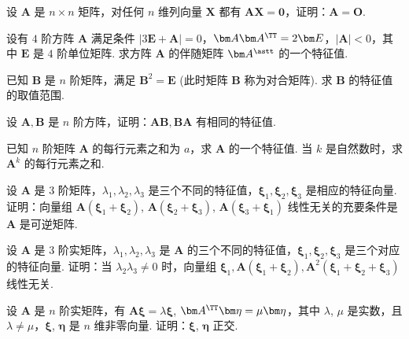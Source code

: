 	\begin{titwo}
		设 $\bm A$ 是 $n \times n$ 矩阵，对任何 $n$ 维列向量 $\bm X$ 都有 $\bm A \bm X = \bm 0$，证明：$\bm A = \bm O$.
	\end{titwo}

	\begin{titwo}
		设有 $4$ 阶方阵 $\bm A$ 满足条件 $|3 \bm E + \bm A| = 0$，$\bm A \bm A^{\TT} = 2 \bm E$，$|\bm A| < 0$，其中 $\bm E$ 是 $4$ 阶单位矩阵. 求方阵 $\bm A$ 的伴随矩阵 $\bm A^{\astt}$ 的一个特征值.
	\end{titwo}

	\begin{titwo}
		已知 $\bm B$ 是 $n$ 阶矩阵，满足 $\bm B^{2} = \bm E$ (此时矩阵 $\bm B$ 称为对合矩阵). 求 $\bm B$ 的特征值的取值范围.
	\end{titwo}

	\begin{titwo}
		设 $\bm A, \bm B$ 是 $n$ 阶方阵，证明：$\bm A \bm B, \bm B \bm A$ 有相同的特征值.
	\end{titwo}

	\begin{titwo}
		已知 $n$ 阶矩阵 $\bm A$ 的每行元素之和为 $a$，求 $\bm A$ 的一个特征值. 当 $k$ 是自然数时，求 $\bm A^{k}$ 的每行元素之和.
	\end{titwo}

	\begin{titwo}
		设 $\bm A$ 是 $3$ 阶矩阵，$\lambda_{1},\lambda_{2},\lambda_{3}$ 是三个不同的特征值，$\bm \xi_{1},\bm \xi_{2},\bm \xi_{3}$ 是相应的特征向量. 证明：向量组 $\bm A(\bm \xi_{1} + \bm \xi_{2})$, $\bm A(\bm \xi_{2} + \bm \xi_{3})$, $\bm A(\bm \xi_{3} + \bm \xi_{1})$ 线性无关的充要条件是 $\bm A$ 是可逆矩阵.
	\end{titwo}

	\begin{titwo}
		设 $\bm A$ 是 $3$ 阶实矩阵，$\lambda_{1},\lambda_{2},\lambda_{3}$ 是 $\bm A$ 的三个不同的特征值，$\bm \xi_{1},\bm \xi_{2},\bm \xi_{3}$ 是三个对应的特征向量. 证明：当 $\lambda_{2} \lambda_{3} \ne 0$ 时，向量组 $\bm \xi_{1},\bm A (\bm \xi_{1} + \bm \xi_{2}),\bm A^{2} (\bm \xi_{1} + \bm \xi_{2} + \bm \xi_{3})$ 线性无关.
	\end{titwo}

	\begin{titwo}
		设 $\bm A$ 是 $n$ 阶实矩阵，有 $\bm A \bm \xi = \lambda \bm \xi$, $\bm A^{\TT} \bm \eta = \mu \bm \eta$，其中 $\lambda$, $\mu$ 是实数，且 $\lambda \ne \mu$，$\bm \xi$, $\bm \eta$ 是 $n$ 维非零向量. 证明：$\bm \xi$, $\bm \eta$ 正交.
	\end{titwo}

